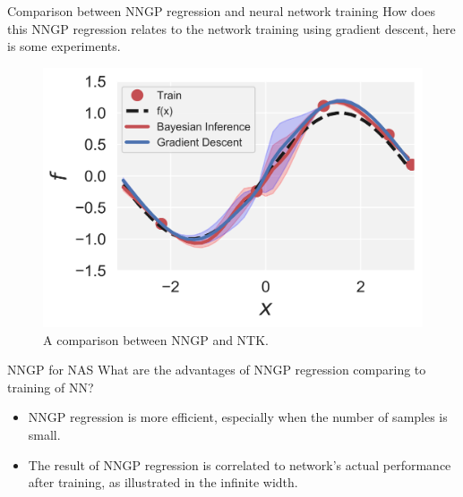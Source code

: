 \documentclass{beamer}
\begin{document}

\begin{frame}{Comparison between NNGP regression and neural network training}
	How does this NNGP regression relates to the network training using gradient descent, here is some experiments.	\begin{figure}[h]
  \centering
  \centerline{\includegraphics[width=0.6\linewidth]{comp.png}}
  \caption{
  A comparison between NNGP and NTK. }
\end{figure}
\end{frame}


\begin{frame}{NNGP for NAS}
	What are the advantages of NNGP regression comparing to training of NN? 
	\begin{itemize}
		\item NNGP regression is more efficient, especially when the number of samples is small.
		\item The result of NNGP regression is correlated to network’s actual performance after training, as illustrated in the infinite width.
	\end{itemize}
\end{frame}
\end{document}
